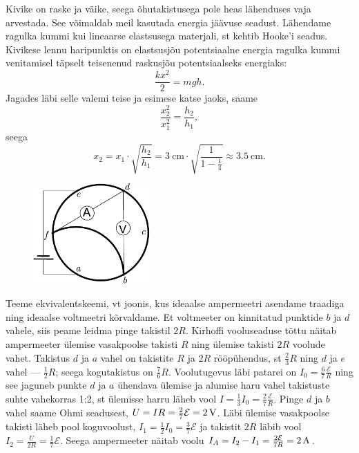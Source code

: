 \documentclass[10pt]{article}
\begin{document}

\solu
Kivike on raske ja väike, seega õhutakistusega pole heas lähenduses vaja arvestada. See võimaldab meil kasutada energia jäävuse seadust. Lähendame ragulka kummi kui lineaarse elastsusega materjali, st kehtib Hooke'i seadus. Kivikese lennu haripunktis on elastsusjõu potentsiaalne energia ragulka kummi venitamisel täpselt teisenenud raskusjõu potentsiaalseks energiaks:
\[
  \frac{kx^2}{2} = mgh.
\]
Jagades läbi selle valemi teise ja esimese katse jaoks, saame
\[
  \frac{x_2^2}{x_1^2} = \frac{h_2}{h_1},
\]
seega
\[
  x_2 = x_1 \cdot \sqrt{\frac{h_2}{h_1}} = \SI{3}{\cm} \cdot \sqrt{\frac{1}{1- \frac{1}{4}}} \approx \SI{3,5}{\cm}.
\]
\probend
\bigskip


\solu
\begin{figure}
	\vspace{-30pt}
	\begin{center}
		\includegraphics[width = 0.4\textwidth]{2018-lahg-03-yl.pdf}
	\end{center}
\end{figure}

Teeme ekvivalentskeemi, vt joonis, kus ideaalse ampermeetri asendame traadiga ning ideaalse voltmeetri kõrvaldame. Et voltmeeter on kinnitatud punktide $b$ ja $d$ vahele, siis peame leidma pinge takistil $2R$. Kirhoffi vooluseaduse tõttu näitab ampermeeter ülemise vasakpoolse takisti $R$ ning ülemise takisti $2R$ voolude vahet. Takistus $d$ ja $a$ vahel on takistite $R$ ja $2R$ rööpühendus, st $\frac 23R$ ning $d$ ja $e$ vahel --- $\frac 12R$; seega kogutakistus on $\frac 76R$. Voolutugevus läbi patarei on $I_0=\frac 67\frac{\mathcal E}R$ ning see jaguneb punkte $d$ ja $a$ ühendava ülemise ja alumise haru vahel takistuste suhte vahekorras 1:2, st ülemisse harru läheb vool $I=\frac 13I_0=\frac 27\frac{\mathcal E}R$. Pinge $d$ ja $b$ vahel saame Ohmi seadusest, $U=IR=\frac 27\mathcal E=\SI 2V$. Läbi ülemise vasakpoolse takisti läheb pool koguvoolust, $I_1=\frac 12 I_0=\frac 37\mathcal E$ ja takistit $2R$ läbib vool $I_2=\frac U{2R}= \frac 17\mathcal E$. Seega ampermeeter näitab voolu $I_A=I_2-I_1=\frac{2\mathcal E}{7R}=\SI 2A$.
\probend
\bigskip
\end{document}
